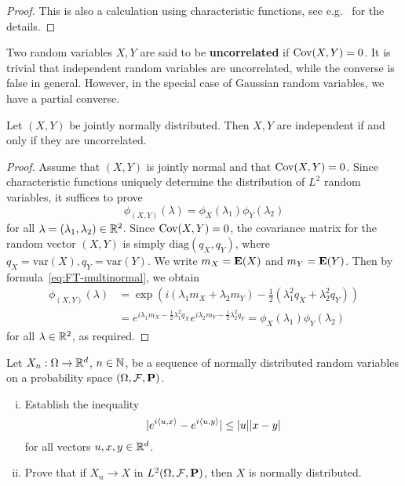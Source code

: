 \begin{proof}
    This is also a calculation using characteristic functions, see e.g.~\cite[Theorem A.5]{Ok03} for the details.
\end{proof}

Two random variables $X,Y$ are said to be \textbf{uncorrelated} if $\operatorname{Cov}(X,Y)=0$. It is trivial that independent random variables are uncorrelated, while the converse is false in general. However, in the special case of Gaussian random variables, we have a partial converse.
\begin{proposition}
\label{prop:gauss-cor}
Let $(X,Y)$ be jointly normally distributed. Then $X,Y$ are independent if and only if they are uncorrelated.
\end{proposition}

\begin{proof}
    Assume that $(X,Y)$ is jointly normal and that $\operatorname{Cov}(X,Y)=0$. Since characteristic functions uniquely determine the distribution of $L^2$ random variables, it suffices to prove
    \begin{equation*}
        \phi_{(X,Y)}(\lambda) = \phi_X(\lambda_1)\phi_Y(\lambda_2)
    \end{equation*}
    for all $\lambda=(\lambda_1,\lambda_2)\in\mathbb{R}^2$. Since $\operatorname{Cov}(X,Y)=0$, the covariance matrix for the random vector $(X,Y)$ is simply $\mathrm{diag}(q_X, q_Y)$, where $q_X=\mathrm{var}(X), q_Y=\mathrm{var}(Y)$. We write $m_X=\mathbf{E}(X)$ and $m_Y=\mathbf{E}(Y)$. Then by formula~\eqref{eq:FT-multinormal}, we obtain
    \begin{align*}
        \phi_{(X,Y)}(\lambda) &= \exp\left(i(\lambda_1 m_X + \lambda_2 m_Y) -\frac{1}{2}(\lambda_1^2 q_X + \lambda_2^2 q_Y)\right) \\
        &= e^{i\lambda_1 m_X - \frac{1}{2}\lambda_1^2 q_X} e^{i\lambda_2 m_Y - \frac{1}{2}\lambda_2^2 q_Y} = \phi_X(\lambda_1)\phi_Y(\lambda_2)
    \end{align*}
    for all $\lambda\in\mathbb{R}^2$, as required.
\end{proof}

\begin{exercise}[Important!]
\label{exer:gaussian-L2-conv}
    Let $X_n:\Omega\to\mathbb{R}^d$, $n\in\mathbb{N}$, be a sequence of normally distributed random variables on a probability space $(\Omega,\mathcal{F},\mathbf{P})$.
    \begin{enumerate}[(i)]
        \item Establish the inequality
        \begin{equation*}
            |e^{i\braket{u,x}}-e^{i\braket{u,y}}|\le |u||x-y|
        \end{equation*}
        for all vectors $u,x,y\in\mathbb{R}^d$.

        \item Prove that if $X_n\to X$ in $L^2(\Omega,\mathcal{F},\mathbf{P})$, then $X$ is normally distributed.
    \end{enumerate}
\end{exercise}

